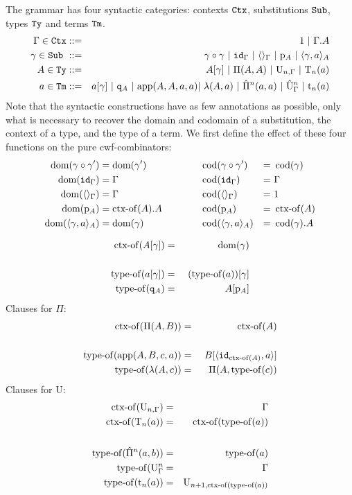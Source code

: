 \documentclass{lmcs}
\def\UU{\mathrm{U}}
\def\Ta{\mathrm{T}}
\def\Pihat{\hat{\Pi}}
\def\UUhat{\hat{\UU}}
\def\t{\mathrm{t}}
\begin{document}
The grammar has four syntactic categories: contexts ${\tt Ctx}$,
substitutions ${\tt Sub}$, types ${\tt Ty}$ and terms ${\tt Tm}$.
\begin{eqnarray*}
\Gamma \in \RawCtx &::=& 1  \ |\ \Gamma.A\\
\gamma \in \RawSub \ &::=& \gamma \circ \gamma \ |\ \id_\Gamma \ |\ \langle\rangle_\Gamma \ |\ \p_{A} \ |\ \langle \gamma, a \rangle_A\\
A \in \RawTy &::=& A[\gamma]   \ |\  \Pi(A,A)\ |\  \UU_{n,\Gamma}  \ |\  \Ta_n(a)\\
a \in \RawTm &::=& a[\gamma] \ |\ \qI_A\ |\  \ap(A,A,a,a) |\ \lambda(A,a)\ |\ \Pihat^n(a,a)\ |\ \UUhat^n_\Gamma \ |\ \t_n(a)
\end{eqnarray*}
Note that the syntactic constructions have as few annotations as possible, only what is
necessary to recover the domain and codomain of a substitution, the context of a type, and the type of a term. We first define the effect of these four functions on the pure cwf-combinators:
\begin{align*}
\operatorname{dom}(\gamma \circ \gamma') &= \operatorname{dom}(\gamma') \quad&\quad\quad & \operatorname{cod}(\gamma \circ \gamma') &=&\  \operatorname{cod}(\gamma)\\
\operatorname{dom}({\tt id}_\Gamma) &= \Gamma\quad& &\operatorname{cod}({\tt id}_\Gamma) &=&\  \Gamma\\
\operatorname{dom}(\langle\rangle_\Gamma) &= \Gamma\quad&&\operatorname{cod}(\langle\rangle_\Gamma) &=&\  1\\
\operatorname{dom}(\mathrm{p}_{A}) &= \operatorname{ctx-of}(A).A\quad&&\operatorname{cod}(\mathrm{p}_{A}) &=&\  \operatorname{ctx-of}(A) \\
\operatorname{dom}(\langle \gamma, a \rangle_A) &= \operatorname{dom}(\gamma)\quad&&\operatorname{cod}(\langle \gamma, a \rangle_A) &=&\  \operatorname{cod}(\gamma).A
\end{align*}

\begin{eqnarray*}
\operatorname{ctx-of}(A[\gamma]) &=& \operatorname{dom}(\gamma)\\
&&\\
\operatorname{type-of}(a[\gamma]) &=&\ (\operatorname{type-of}(a))[\gamma]\\
\operatorname{type-of}({\tt q}_A) &=&\ A[\mathrm{p}_{A}]
\end{eqnarray*}
Clauses for $\Pi$:
\begin{eqnarray*}
\operatorname{ctx-of}(\Pi(A,B)) &=& \operatorname{ctx-of}(A)\\
&&\\
\operatorname{type-of}(\mathrm{app}(A,B,c,a)) &=&\ B[\langle {\tt id}_{\operatorname{ctx-of}(A)},a \rangle ]\\
\quad \operatorname{type-of}(\lambda(A,c)) &=& \Pi(A,\operatorname{type-of}(c))
\end{eqnarray*}
Clauses for $\UU$:
\begin{eqnarray*}
\ctxof(\UU_{n,\Gamma}) &=& \Gamma\\
\ctxof(\Ta_n(a)) &=& \ctxof(\typeof(a))\\
&&\\
\typeof(\Pihat^n(a,b))&=& \typeof(a)\\
\typeof(\UU^n_\Gamma &=& \Gamma\\
\typeof(\t_n(a)) &=& \UU_{n+1,\ctxof(\typeof(a))}
\end{eqnarray*}
\end{document}
